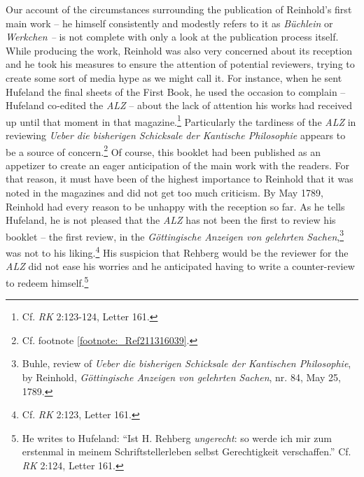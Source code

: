  Our account of the circumstances surrounding the publication of Reinhold's first main work {--} he himself consistently and modestly refers to it as \textit{B\"{u}chlein} or \textit{Werkchen {--} }is not complete with only a look at the publication process itself. While producing the work, Reinhold was also very concerned about its reception and he took his measures to ensure the attention of potential reviewers, trying to create some sort of media hype as we might call it. For instance, when he sent Hufeland the final sheets of the First Book, he used the occasion to complain {--} Hufeland co{-}edited the \textit{ALZ} {--} about the lack of attention his works had received up until that moment in that magazine.\footnote{ Cf. \textit{RK} 2:123{-}124, Letter 161.} Particularly the tardiness of the \textit{ALZ} in reviewing \textit{Ueber die bisherigen Schicksale der Kantische Philosophie} appears to be a source of concern.\footnote{ Cf. footnote \ref{footnote:_Ref211316039}. } Of course, this booklet had been published as an appetizer to create an eager anticipation of the main work with the readers. For that reason, it must have been of the highest importance to Reinhold that it was noted in the magazines and did not get too much criticism. By May 1789, Reinhold had every reason to be unhappy with the reception so far. As he tells Hufeland, he is not pleased that the \textit{ALZ} has not been the first to review his booklet {--} the first review, in the \textit{G\"{o}ttingische Anzeigen von gelehrten Sachen},\footnote{ Buhle, review of\textit{ Ueber die bisherigen Schicksale der Kantischen Philosophie}, by Reinhold, \textit{G\"{o}ttingische Anzeigen von gelehrten Sachen}, nr. 84, May 25, 1789.} was not to his liking.\footnote{ Cf. \textit{RK} 2:123, Letter 161.} His suspicion that Rehberg would be the reviewer for the \textit{ALZ }did not ease his worries and he anticipated having to write a counter{-}review to redeem himself.\footnote{ He writes to Hufeland: ``Ist H. Rehberg \textit{ungerecht}: so werde ich mir zum erstenmal in meinem Schriftstellerleben selbst Gerechtigkeit verschaffen.'' Cf. \textit{RK} 2:124, Letter 161. }

